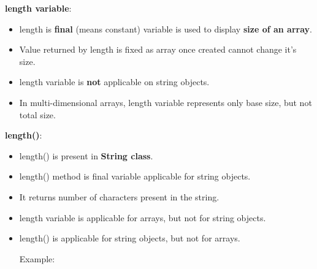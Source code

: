 \newpage




\setlength{\columnsep}{3pt}
\begin{flushleft}
	
	\textbf{length variable}:
	\begin{itemize}
		\item length is \textbf{final} (means constant) variable is used to display \textbf{size of an array}.
		\item Value returned by length is fixed as array once created cannot change it's size.
		\bigskip
		\bigskip
		
		\item length variable is \textbf{not} applicable on string objects.
		\bigskip
		
		\item In multi-dimensional arrays, length variable represents only base size, but not total size.
		\bigskip
		\bigskip
		
	\end{itemize}
	
	\textbf{length()}:
	\begin{itemize}
		\item length() is present in \textbf{String class}.
		\item length() method is final variable applicable for string objects.
		\item It returns number of characters present in the string.
		\bigskip
		\bigskip
		\bigskip
		
		\item length variable is applicable for arrays, but not for string objects.
		\item length() is applicable for string objects, but not for arrays.
		
		
		Example:
		\bigskip	
		

\end{itemize}
\end{flushleft}
